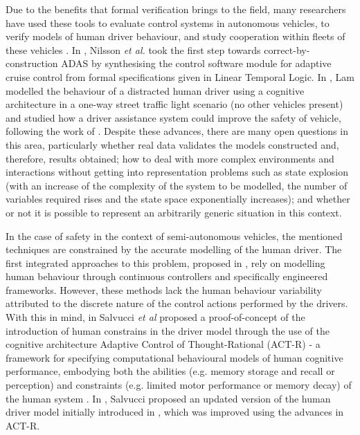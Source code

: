 Due to the benefits that formal verification brings to the field, many researchers have used these tools to evaluate control systems in autonomous vehicles, to verify models of human driver behaviour, and study cooperation within fleets of these vehicles \cite{games, fv2, fv3, fv1}. In \cite{nilsson}, Nilsson \textit{et al.} took the first step towards correct-by-construction ADAS by synthesising the control software module for adaptive cruise control from formal specifications given in Linear Temporal Logic. In \cite{lam}, Lam modelled the behaviour of a distracted human driver using a cognitive architecture in a one-way street traffic light scenario (no other vehicles present) and studied how a driver assistance system could improve the safety of vehicle, following the work of \cite{salvucci_1, curzon}. Despite these advances, there are many open questions in this area, particularly whether real data validates the models constructed and, therefore, results obtained; how to deal with more complex environments and interactions without getting into representation problems such as state explosion (with an increase of the complexity of the system to be modelled, the number of variables required rises and the state space exponentially increases); and whether or not it is possible to represent an arbitrarily generic situation in this context.

In the case of safety in the context of semi-autonomous vehicles, the mentioned techniques are constrained by the accurate modelling of the human driver. The first integrated approaches to this problem, proposed in \cite{boer, older_1, older_3}, rely on modelling human behaviour through continuous controllers and specifically engineered frameworks. However, these methods lack the human behaviour variability attributed to the discrete nature of the control actions performed by the drivers. With this in mind, in \cite{salvucci_0} Salvucci \textit{et al} proposed a proof-of-concept of the introduction of human constrains in the driver model through the use of the cognitive architecture Adaptive Control of Thought-Rational (ACT-R) - a framework for specifying computational behavioural models of human cognitive performance, embodying both the abilities (e.g. memory storage and recall or perception) and constraints (e.g. limited motor performance or memory decay) of the human system \cite{salvucci_1}. In \cite{salvucci_1}, Salvucci proposed an updated version of the human driver model initially introduced in \cite{salvucci_0}, which was improved using the advances in ACT-R.


